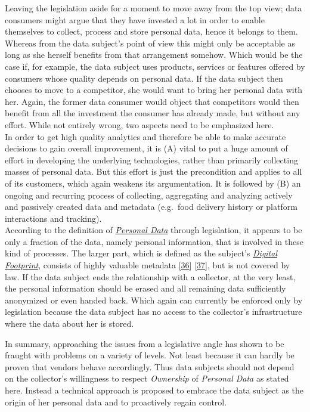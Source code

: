 \documentclass[12pt,english,a4paper,titlepage,cleardoublepage=empty,dottedtoc]{report}
\begin{document}
Leaving the legislation aside for a moment to move away from the top
view; data consumers might argue that they have invested a lot in order
to enable themselves to collect, process and store personal data, hence
it belongs to them. Whereas from the data subject's point of view this
might only be acceptable as long as she herself benefits from that
arrangement somehow. Which would be the case if, for example, the data
subject uses products, services or features offered by consumers whose
quality depends on personal data. If the data subject then chooses to
move to a competitor, she would want to bring her personal data with
her. Again, the former data consumer would object that competitors would
then benefit from all the investment the consumer has already made, but
without any effort. While not entirely wrong, two aspects need to be
emphasized here.\\
In order to get high quality analytics and therefore be able to make
accurate decisions to gain overall improvement, it is (A) vital to put a
huge amount of effort in developing the underlying technologies, rather
than primarily collecting masses of personal data. But this effort is
just the precondition and applies to all of its customers, which again
weakens its argumentation. It is followed by (B) an ongoing and
recurring process of collecting, aggregating and analyzing actively and
passively created data and metadata (e.g.~food delivery history or
platform interactions and tracking).\\
According to the definition of
\emph{\protect\hyperlink{def--personal-data-as-of-legis}{Personal Data}}
through legislation, it appears to be only a fraction of the data,
namely personal information, that is involved in these kind of
processes. The larger part, which is defined as the subject's
\emph{\protect\hyperlink{terminologies--digital-footprint}{Digital
Footprint}}, consists of highly valuable metadata
{[}\protect\hyperlink{ref-web_2013_why-metadata-matters}{36}{]}
{[}\protect\hyperlink{ref-web_2016_why-you-need-metadata-for-big-data-to-success}{37}{]},
but is not covered by law. If the data subject ends the relationship
with a collector, at the very least, the personal information should be
erased and all remaining data sufficiently anonymized or even handed
back. Which again can currently be enforced only by legislation because
the data subject has no access to the collector's infrastructure where
the data about her is stored.

In summary, approaching the issues from a legislative angle has shown to
be fraught with problems on a variety of levels. Not least because it
can hardly be proven that vendors behave accordingly. Thus data subjects
should not depend on the collector's willingness to respect
\emph{Ownership} of \emph{Personal Data} as stated here. Instead a
technical approach is proposed to embrace the data subject as the origin
of her personal data and to proactively regain control.
\end{document}
